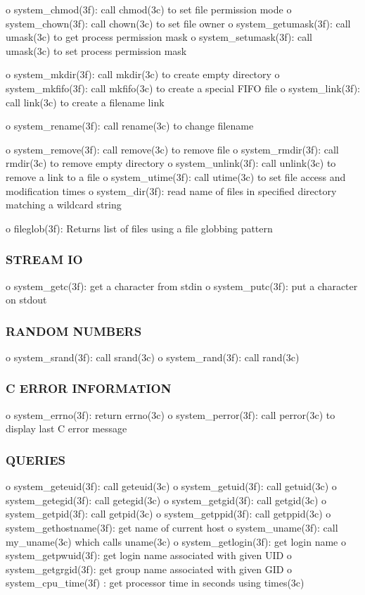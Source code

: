 o system\+\_\+chmod(3f)\+: call chmod(3c) to set file permission mode o system\+\_\+chown(3f)\+: call chown(3c) to set file owner o system\+\_\+getumask(3f)\+: call umask(3c) to get process permission mask o system\+\_\+setumask(3f)\+: call umask(3c) to set process permission mask

o system\+\_\+mkdir(3f)\+: call mkdir(3c) to create empty directory o system\+\_\+mkfifo(3f)\+: call mkfifo(3c) to create a special F\+I\+FO file o system\+\_\+link(3f)\+: call link(3c) to create a filename link

o system\+\_\+rename(3f)\+: call rename(3c) to change filename

o system\+\_\+remove(3f)\+: call remove(3c) to remove file o system\+\_\+rmdir(3f)\+: call rmdir(3c) to remove empty directory o system\+\_\+unlink(3f)\+: call unlink(3c) to remove a link to a file o system\+\_\+utime(3f)\+: call utime(3c) to set file access and modification times o system\+\_\+dir(3f)\+: read name of files in specified directory matching a wildcard string

o fileglob(3f)\+: Returns list of files using a file globbing pattern

\subsubsection*{S\+T\+R\+E\+AM IO}

o system\+\_\+getc(3f)\+: get a character from stdin o system\+\_\+putc(3f)\+: put a character on stdout \subsubsection*{R\+A\+N\+D\+OM N\+U\+M\+B\+E\+RS}

o system\+\_\+srand(3f)\+: call srand(3c) o system\+\_\+rand(3f)\+: call rand(3c) \subsubsection*{C E\+R\+R\+OR I\+N\+F\+O\+R\+M\+A\+T\+I\+ON}

o system\+\_\+errno(3f)\+: return errno(3c) o system\+\_\+perror(3f)\+: call perror(3c) to display last C error message \subsubsection*{Q\+U\+E\+R\+I\+ES}

o system\+\_\+geteuid(3f)\+: call geteuid(3c) o system\+\_\+getuid(3f)\+: call getuid(3c) o system\+\_\+getegid(3f)\+: call getegid(3c) o system\+\_\+getgid(3f)\+: call getgid(3c) o system\+\_\+getpid(3f)\+: call getpid(3c) o system\+\_\+getppid(3f)\+: call getppid(3c) o system\+\_\+gethostname(3f)\+: get name of current host o system\+\_\+uname(3f)\+: call my\+\_\+uname(3c) which calls uname(3c) o system\+\_\+getlogin(3f)\+: get login name o system\+\_\+getpwuid(3f)\+: get login name associated with given U\+ID o system\+\_\+getgrgid(3f)\+: get group name associated with given G\+ID o system\+\_\+cpu\+\_\+time(3f) \+: get processor time in seconds using times(3c)

